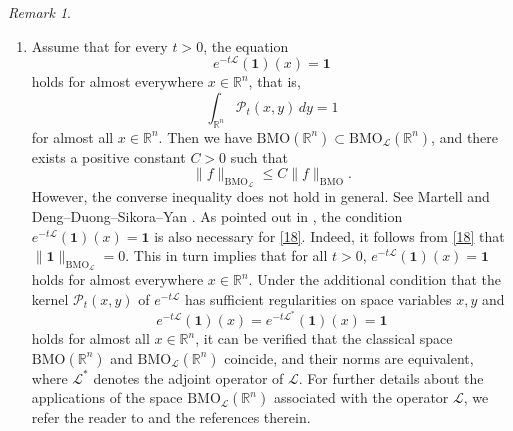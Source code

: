 \documentclass[10pt, reqno]{amsart}
\theoremstyle{definition}
\theoremstyle{remark}
\newtheorem{remark}[theorem]{Remark}
\numberwithin{equation}{section}
\begin{document}
\begin{remark}
\begin{enumerate}
\begin{equation*}
\big\|f\big\|_{\mathrm{BMO}^p_{\mathcal{L}}}:=
\sup_{\mathcal{B}\subset\mathbb R^n}\bigg(\frac{1}{m(\mathcal{B})}
\int_{\mathcal{B}}\big|f(y)-e^{-t_{\mathcal{B}}\mathcal{L}}f(y)\big|^pdy\bigg)^{1/p}<+\infty.
\end{equation*}
Then for all $1\leq p<\infty$, the spaces $\mathrm{BMO}^p_{\mathcal{L}}(\mathbb R^n)$ coincide, and the norms $\|\cdot\|_{\mathrm{BMO}^p_{\mathcal{L}}}$ are equivalent with respect to different values of $p$. See \cite{deng2,duong2,duong3} for more details.
\item Assume that for every $t>0$, the equation
\begin{equation*}
e^{-t\mathcal{L}}(\mathbf{1})(x)=\mathbf{1}
\end{equation*}
holds for almost everywhere $x\in\mathbb R^n$, that is,
\begin{equation*}
\int_{\mathbb R^n}\mathcal{P}_t(x,y)\,dy=1
\end{equation*}
for almost all $x\in\mathbb R^n$. Then we have $\mathrm{BMO}(\mathbb R^n)\subset\mathrm{BMO}_{\mathcal{L}}(\mathbb R^n)$, and there exists a positive constant $C>0$ such that
\begin{equation}\label{18}
\big\|f\big\|_{\mathrm{BMO}_{\mathcal{L}}}\leq C\big\|f\big\|_{\mathrm{BMO}}.
\end{equation}
However, the converse inequality does not hold in general. See Martell \cite[Proposition 3.1]{martell} and Deng--Duong--Sikora--Yan \cite[Proposition 2.3]{deng}. As pointed out in \cite{deng}, the condition $e^{-t\mathcal{L}}(\mathbf{1})(x)=\mathbf{1}$ is also necessary for \eqref{18}. Indeed, it follows from \eqref{18} that $\big\|\mathbf{1}\big\|_{\mathrm{BMO}_{\mathcal{L}}}=0$. This in turn implies that for all $t>0$, $e^{-t\mathcal{L}}(\mathbf{1})(x)=\mathbf{1}$ holds for almost everywhere $x\in\mathbb R^n$. Under the additional condition that the kernel $\mathcal{P}_t(x,y)$ of $e^{-t\mathcal L}$ has sufficient regularities on space variables $x,y$ and
\begin{equation*}
e^{-t\mathcal{L}}(\mathbf{1})(x)=e^{-t\mathcal{L}^{*}}(\mathbf{1})(x)=\mathbf{1}
\end{equation*}
holds for almost all $x\in\mathbb R^n$, it can be verified that the classical space $\mathrm{BMO}(\mathbb R^n)$ and $\mathrm{BMO}_{\mathcal{L}}(\mathbb R^n)$ coincide, and their norms are equivalent, where $\mathcal{L}^{*}$ denotes the adjoint operator of $\mathcal{L}$. For further details about the applications of the space $\mathrm{BMO}_{\mathcal{L}}(\mathbb R^n)$ associated with the operator $\mathcal{L}$, we refer the reader to \cite{deng2,deng,duong2,duong3} and the references therein.
\end{enumerate}
\end{remark}
\end{document}
